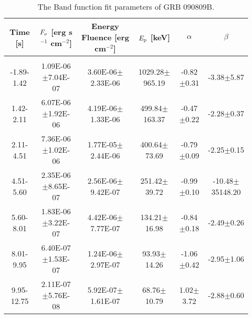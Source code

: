 \begin{table}[h]
\centering
\scriptsize
\label{tab:}
\begin{tabular}{c| c c c c c}
Time [s] & $F_{\nu}$ [erg s$^{-1}$ cm$^{-2}$] & Energy Fluence [erg cm$^{-2}$] & $E_{\rm p}$ [keV] & $\alpha$ & $\beta$ \\
\hline \hline\\ 

-1.89-1.42 & 1.09E-06$\pm$7.04E-07 & 3.60E-06$\pm$2.33E-06 & 1029.28$\pm$965.19 & -0.82$\pm$0.31 & -3.38$\pm$5.87 \\ 

1.42-2.11 & 6.07E-06$\pm$1.92E-06 & 4.19E-06$\pm$1.33E-06 & 499.84$\pm$163.37 & -0.47$\pm$0.22 & -2.28$\pm$0.37 \\ 

2.11-4.51 & 7.36E-06$\pm$1.02E-06 & 1.77E-05$\pm$2.44E-06 & 400.64$\pm$73.69 & -0.79$\pm$0.09 & -2.25$\pm$0.15 \\ 

4.51-5.60 & 2.35E-06$\pm$8.65E-07 & 2.56E-06$\pm$9.42E-07 & 251.42$\pm$39.72 & -0.99$\pm$0.10 & -10.48$\pm$35148.20 \\ 

5.60-8.01 & 1.83E-06$\pm$3.22E-07 & 4.42E-06$\pm$7.77E-07 & 134.21$\pm$16.98 & -0.84$\pm$0.18 & -2.49$\pm$0.26 \\ 

8.01-9.95 & 6.40E-07$\pm$1.53E-07 & 1.24E-06$\pm$2.97E-07 & 93.93$\pm$14.26 & -1.06$\pm$0.42 & -2.95$\pm$1.06 \\ 

9.95-12.75 & 2.11E-07$\pm$5.76E-08 & 5.92E-07$\pm$1.61E-07 & 68.76$\pm$10.79 & 1.02$\pm$3.72 & -2.88$\pm$0.60 \\ 

\end{tabular}
\caption{The Band function fit parameters of GRB 090809B.}
\end{table}

